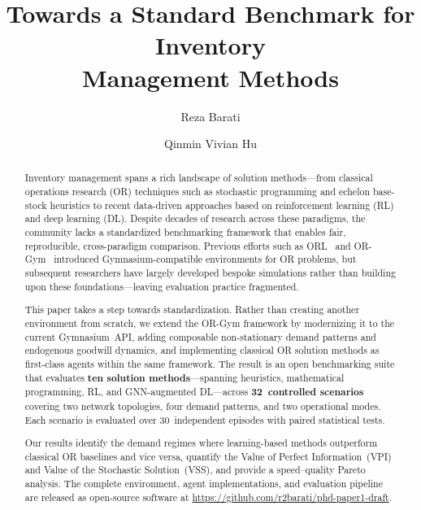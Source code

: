 \documentclass[preprint,12pt]{elsarticle}
\begin{document}
\begin{frontmatter}

\title{Towards a Standard Benchmark for Inventory\\
       Management Methods}

\author[tmu]{Reza Barati}

\author[tmu]{Qinmin Vivian Hu}


\begin{abstract}
Inventory management spans a rich landscape of solution methods---from
classical operations research (OR) techniques such as stochastic programming
and echelon base-stock heuristics to recent data-driven approaches based on
reinforcement learning (RL) and deep learning (DL). Despite decades of
research across these paradigms, the community lacks a standardized
benchmarking framework that enables fair, reproducible, cross-paradigm
comparison. Previous efforts such as ORL~\citep{balaji2019orl} and
OR-Gym~\citep{hubbs2020orgym} introduced Gymnasium-compatible environments
for OR problems, but subsequent researchers have largely developed bespoke
simulations rather than building upon these foundations---leaving evaluation
practice fragmented.

This paper takes a step towards standardization. Rather than creating
another environment from scratch, we extend the OR-Gym framework by
modernizing it to the current Gymnasium~API, adding composable
non-stationary demand patterns and endogenous goodwill dynamics, and
implementing classical OR solution methods as first-class agents within
the same framework. The result is an open benchmarking suite that evaluates
\textbf{ten solution methods}---spanning heuristics, mathematical
programming, RL, and GNN-augmented DL---across \textbf{32~controlled
scenarios} covering two network topologies, four demand patterns, and two
operational modes. Each scenario is evaluated over 30~independent episodes
with paired statistical tests.

Our results identify the demand regimes where learning-based methods
outperform classical OR baselines and vice versa, quantify the
Value of Perfect Information~(VPI) and Value of the Stochastic
Solution~(VSS), and provide a speed--quality Pareto analysis.
The complete environment, agent implementations, and evaluation pipeline
are released as open-source software at
\url{https://github.com/r2barati/phd-paper1-draft}.
\end{abstract}


\end{frontmatter}
\end{document}
